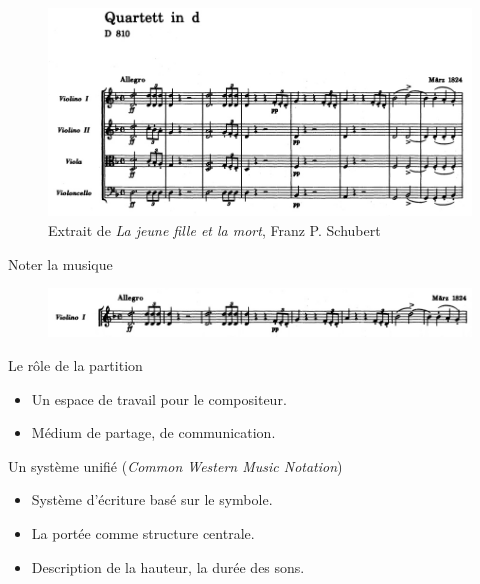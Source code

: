 \documentclass[pdf]{beamer}
\begin{document}
\begin{frame}
	\begin{figure}
		\centering
		\includegraphics[keepaspectratio=true, width=\textwidth]{./medias/deathAndTheMaiden_extract1.jpg}
		\caption{Extrait de \textit{La jeune fille et la mort}, Franz P. Schubert}
	\end{figure}
\end{frame}

\begin{frame}{Noter la musique}
\begin{figure}
	\centering
	\includegraphics[keepaspectratio=true, width=\textwidth]{./medias/deathAndTheMaiden_extract2.jpg}
\end{figure}
\begin{block}{Le rôle de la partition} 
\begin{itemize}[label={$\square$}]
	\item Un espace de travail pour le compositeur.
	\item Médium de partage, de communication.
\end{itemize}
\end{block}
\begin{block}{Un système unifié (\textit{Common Western Music Notation})}
\begin{itemize}[label={$\square$}]
	\item Système d'écriture basé sur le symbole.
	\item La portée comme structure centrale.
	\item Description de la hauteur, la durée des sons.
\end{itemize}
\end{block}

\end{frame}
\end{document}
